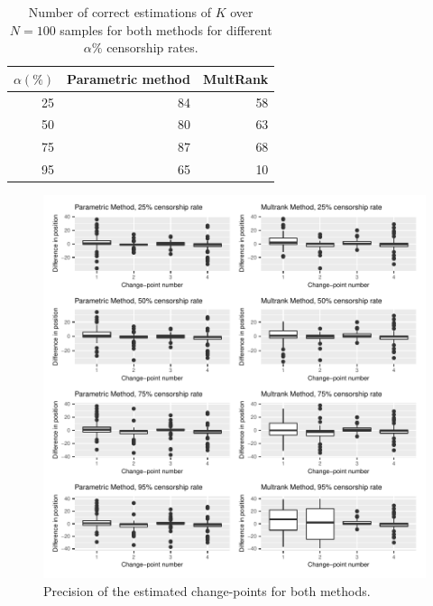 \begin{table}[ht]
\centering
\begin{tabular}{|r|r|r|}
  \hline
   $\alpha(\%)$  & Parametric method & MultRank \\ 
  \hline
 25 &  84 &  58 \\ 
 50 &  80 &  63 \\ 
 75 &  87 &  68 \\ 
 95 &  65 &  10 \\ 
   \hline
\end{tabular}
\caption{Number of correct estimations of $K$ over $N=100$ samples for both methods for different $\alpha\%$ censorship rates.}
\label{tab:simcomp}
\end{table}

\begin{figure}[ht]
    \centering
    \includegraphics{figs/Chap4/P_RUPT.pdf}
    \caption{Precision of the estimated change-points for both methods.}
    \label{fig:prec_sim}
\end{figure}
